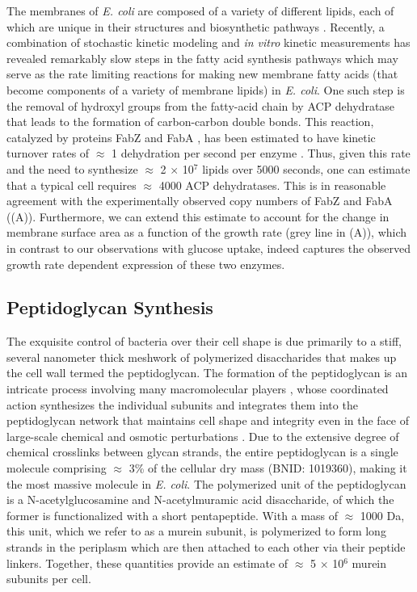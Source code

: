 The membranes of \textit{E. coli} are composed of a variety of different lipids,
each of which are unique in their structures and biosynthetic pathways
\citep{sohlenkamp2016}. Recently, a combination of stochastic kinetic modeling
\citep{ruppe2018} and \textit{in vitro} kinetic measurements
\citep{ranganathan2012, yu2011} has revealed remarkably slow steps in the fatty
acid synthesis pathways which may serve as the rate limiting reactions for
making new membrane fatty acids (that become components of a variety of
membrane lipids) in \textit{E. coli}. One such step is the removal of hydroxyl
groups from the fatty-acid chain by ACP dehydratase that leads to the formation
of carbon-carbon double bonds. This reaction, catalyzed by proteins FabZ and
FabA \citep{yu2011}, has been estimated to have kinetic
turnover rates of $\approx$ 1 dehydration per second per enzyme
\citep{ruppe2018}. Thus, given this rate and the need to synthesize $\approx$ 2
$\times$ 10$^7$ lipids over 5000 seconds, one can estimate that a typical cell
requires $\approx$ 4000 ACP dehydratases. This is in reasonable agreement with
the experimentally observed copy numbers of FabZ and FabA
((A)). Furthermore, we can extend this estimate to account
for the change in membrane surface area as a function of the growth rate (grey
line in (A)), which in contrast to our observations with glucose uptake, indeed captures the observed growth rate
dependent expression of these two enzymes.

\subsection{Peptidoglycan Synthesis}
The exquisite control of bacteria over their cell shape is due primarily to a stiff, several nanometer thick meshwork of
polymerized disaccharides that makes up the cell wall termed the peptidoglycan. The formation of the peptidoglycan is an intricate
process involving many macromolecular players \citep{shi2018, morgenstein2015},
whose coordinated action synthesizes the individual subunits and integrates them
into the peptidoglycan network that maintains cell shape and integrity even in the face of
large-scale chemical and osmotic perturbations \citep{harris2018,shi2018}.
Due to the extensive degree of chemical crosslinks between glycan strands, the
entire peptidoglycan is a single molecule comprising $\approx$ 3\% of the cellular dry mass (BNID:
1019360), making it the most massive molecule in \textit{E. coli}. The
polymerized unit of the peptidoglycan is a N-acetylglucosamine and
N-acetylmuramic acid disaccharide, of which the former is functionalized with a
short pentapeptide. With a mass of $\approx$ 1000 Da, this unit, which we refer
to as a murein subunit, is polymerized to form long strands in the periplasm
which are then attached to each other via their peptide linkers. Together, these
quantities provide an estimate of $\approx$ 5 $\times$ 10$^6$ murein subunits
per cell.

